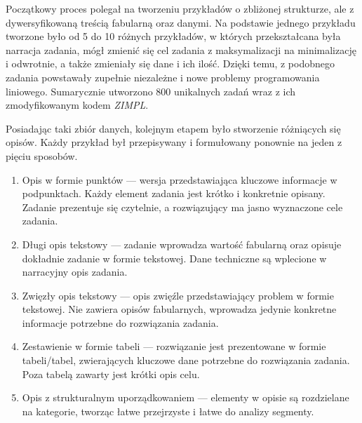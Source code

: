 Początkowy proces polegał na tworzeniu przykładów o zbliżonej strukturze, ale z dywersyfikowaną treścią fabularną oraz danymi. Na podstawie jednego przykładu tworzone było od 5 do 10 różnych przykładów, w których przekształcana była narracja zadania, mógł zmienić się cel zadania z maksymalizacji na minimalizację i odwrotnie, a także zmieniały się dane i ich ilość. Dzięki temu, z podobnego zadania powstawały zupełnie niezależne i nowe problemy programowania liniowego. Sumarycznie utworzono 800 unikalnych zadań wraz z ich zmodyfikowanym kodem  \textit{ZIMPL}. %

Posiadając taki zbiór danych, kolejnym etapem było stworzenie różniących się opisów. Każdy przykład był przepisywany i formułowany ponownie na jeden z pięciu sposobów.

\begin{enumerate}
\item Opis w formie punktów --- wersja przedstawiająca kluczowe informacje w podpunktach. Każdy element zadania jest krótko i konkretnie opisany. Zadanie prezentuje się czytelnie, a rozwiązujący ma jasno wyznaczone cele zadania.
\item Długi opis tekstowy --- zadanie wprowadza wartość fabularną oraz opisuje dokładnie zadanie w formie tekstowej. Dane techniczne są wplecione w narracyjny opis zadania.
\item Zwięzły opis tekstowy --- opis zwięźle przedstawiający problem w formie tekstowej. Nie zawiera opisów fabularnych, wprowadza jedynie konkretne informacje potrzebne do rozwiązania zadania.
\item Zestawienie w formie tabeli --- rozwiązanie jest prezentowane w formie tabeli/tabel, zwierających kluczowe dane potrzebne do rozwiązania zadania. Poza tabelą zawarty jest krótki opis celu.
\item Opis z strukturalnym uporządkowaniem --- elementy w opisie są rozdzielane na kategorie, tworząc łatwe przejrzyste i łatwe do analizy segmenty.
\end{enumerate}


